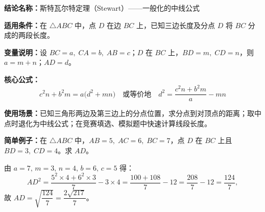 \textbf{结论名称：}斯特瓦尔特定理（Stewart）——一般化的中线公式

\textbf{适用条件：}在 \(\triangle ABC\) 中，点 \(D\) 在边 \(BC\) 上，已知三边长度及分点 \(D\) 将 \(BC\) 分成的两段长度。

\textbf{变量说明：}设 \(BC=a,\;CA=b,\;AB=c\)；\(D\) 在 \(BC\) 上，\(BD=m,\;CD=n\)，则 \(a=m+n\)；\(AD=d\)。

\textbf{核心公式：}
\[
\boxed{c^{2}n + b^{2}m = a\bigl(d^{2} + mn\bigr)}
\quad\text{或等价地}\quad
\boxed{d^{2} = \frac{c^{2}n + b^{2}m}{a} - mn}
\]

\textbf{使用场景：}已知三角形两边及第三边上的分点位置，求分点到对顶点的距离；取中点时退化为中线公式；在竞赛填选、模拟题中快速计算线段长度。

\textbf{简单例子：}在 \(\triangle ABC\) 中，\(AB=5,\;AC=6,\;BC=7\)，点 \(D\) 在 \(BC\) 上且 \(BD=3,\;CD=4\)。求 \(AD\)。

由 \(a=7,\,m=3,\,n=4,\,b=6,\,c=5\) 得：
\[
AD^{2}= \frac{5^{2}\times 4 + 6^{2}\times 3}{7} - 3\times 4
= \frac{100+108}{7} - 12 = \frac{208}{7} - 12 = \frac{124}{7},
\]
故 \(AD=\sqrt{\dfrac{124}{7}}=\dfrac{2\sqrt{217}}{7}\)。